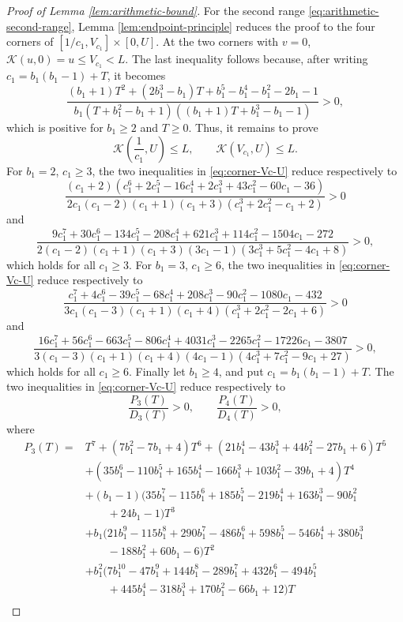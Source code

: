 \documentclass[10pt,a4paper]{amsart}
\newcommand{\Kfun}{\mathcal K}
\begin{document}
\begin{proof}[Proof of Lemma \ref{lem:arithmetic-bound}]
For the second range \eqref{eq:arithmetic-second-range}, Lemma \ref{lem:endpoint-principle} reduces the proof
to the four corners of $[1/c_1,V_{c_1}]\times[0,U]$.  At the two corners with
$v=0$, $\Kfun(u,0)=u\le V_{c_1}<L$.  The last inequality follows because, after writing $c_1=b_1(b_1-1)+T$, it becomes
$$
        \frac{(b_1+1)T^2+(2b_1^3-b_1)T+b_1^5-b_1^4-b_1^2-2b_1-1}{b_1(T+b_1^2-b_1+1)((b_1+1)T+b_1^3-b_1-1)}>0,
$$
which is positive for $b_1\ge2$ and $T\ge0$.
Thus, it remains to prove
\begin{equation}\label{eq:corner-Vc-U}
        \Kfun\left(\frac{1}{c_1},U\right)\le L,
        \qquad
        \Kfun(V_{c_1},U)\le L.
\end{equation}
For $b_1=2$, $c_1\geq3$, the two inequalities in \eqref{eq:corner-Vc-U} reduce respectively to
$$
        \frac{(c_1+2)(c_1^6+2c_1^5-16c_1^4+2c_1^3+43c_1^2-60c_1-36)}{2c_1(c_1-2)(c_1+1)(c_1+3)(c_1^3+2c_1^2-c_1+2)}>0
$$
and
$$
        \frac{9c_1^7+30c_1^6-134c_1^5-208c_1^4+621c_1^3+114c_1^2-1504c_1-272}{2(c_1-2)(c_1+1)(c_1+3)(3c_1-1)(3c_1^3+5c_1^2-4c_1+8)}>0,
$$
which holds for all $c_1\ge3$.
For $b_1=3$, $c_1\geq6$, the two inequalities in \eqref{eq:corner-Vc-U} reduce respectively to
$$
        \frac{c_1^7+4c_1^6-39c_1^5-68c_1^4+208c_1^3-90c_1^2-1080c_1-432}{3c_1(c_1-3)(c_1+1)(c_1+4)(c_1^3+2c_1^2-2c_1+6)}>0
$$
and
$$
        \frac{16c_1^7+56c_1^6-663c_1^5-806c_1^4+4031c_1^3-2265c_1^2-17226c_1-3807}{3(c_1-3)(c_1+1)(c_1+4)(4c_1-1)(4c_1^3+7c_1^2-9c_1+27)}>0,
$$
which holds for all $c_1\ge6$.
Finally let $b_1\ge4$, and put $c_1=b_1(b_1-1)+T$.  The two inequalities in \eqref{eq:corner-Vc-U} reduce respectively to
$$
        \frac{P_3(T)}{D_3(T)}>0,
        \qquad
        \frac{P_4(T)}{D_4(T)}>0,
$$
where
\begin{align*}
P_3(T)={}&T^7+(7b_1^2-7b_1+4)T^6+(21b_1^4-43b_1^3+44b_1^2-27b_1+6)T^5\\
        &+(35b_1^6-110b_1^5+165b_1^4-166b_1^3+103b_1^2-39b_1+4)T^4\\
        &+(b_1-1)(35b_1^7-115b_1^6+185b_1^5-219b_1^4+163b_1^3-90b_1^2\\
        &\qquad +24b_1-1)T^3\\
        &+b_1(21b_1^9-115b_1^8+290b_1^7-486b_1^6+598b_1^5-546b_1^4+380b_1^3\\
        &\qquad -188b_1^2+60b_1-6)T^2\\
        &+b_1^2(7b_1^{10}-47b_1^9+144b_1^8-289b_1^7+432b_1^6-494b_1^5\\
        &\qquad +445b_1^4-318b_1^3+170b_1^2-66b_1+12)T\\

\end{align*}
\end{proof}
\end{document}
